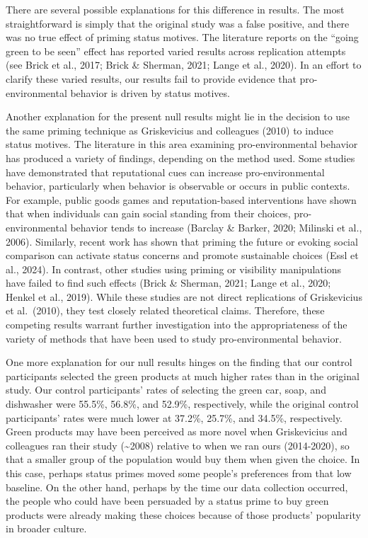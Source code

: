 \documentclass[
]{article}
\begin{document}
There are several possible explanations for this difference in results.
The most straightforward is simply that the original study was a false
positive, and there was no true effect of priming status motives. The
literature reports on the ``going green to be seen'' effect has reported
varied results across replication attempts (see Brick et al., 2017;
Brick \& Sherman, 2021; Lange et al., 2020). In an effort to clarify
these varied results, our results fail to provide evidence that
pro-environmental behavior is driven by status motives.

Another explanation for the present null results might lie in the
decision to use the same priming technique as Griskevicius and
colleagues (2010) to induce status motives. The literature in this area
examining pro-environmental behavior has produced a variety of findings,
depending on the method used. Some studies have demonstrated that
reputational cues can increase pro-environmental behavior, particularly
when behavior is observable or occurs in public contexts. For example,
public goods games and reputation-based interventions have shown that
when individuals can gain social standing from their choices,
pro-environmental behavior tends to increase (Barclay \& Barker, 2020;
Milinski et al., 2006). Similarly, recent work has shown that priming
the future or evoking social comparison can activate status concerns and
promote sustainable choices (Essl et al., 2024). In contrast, other
studies using priming or visibility manipulations have failed to find
such effects (Brick \& Sherman, 2021; Lange et al., 2020; Henkel et al.,
2019). While these studies are not direct replications of Griskevicius
et al.~(2010), they test closely related theoretical claims. Therefore,
these competing results warrant further investigation into the
appropriateness of the variety of methods that have been used to study
pro-environmental behavior.

One more explanation for our null results hinges on the finding that our
control participants selected the green products at much higher rates
than in the original study. Our control participants' rates of selecting
the green car, soap, and dishwasher were 55.5\%, 56.8\%, and 52.9\%,
respectively, while the original control participants' rates were much
lower at 37.2\%, 25.7\%, and 34.5\%, respectively. Green products may
have been perceived as more novel when Griskevicius and colleagues ran
their study (\textasciitilde2008) relative to when we ran ours
(2014-2020), so that a smaller group of the population would buy them
when given the choice. In this case, perhaps status primes moved some
people's preferences from that low baseline. On the other hand, perhaps
by the time our data collection occurred, the people who could have been
persuaded by a status prime to buy green products were already making
these choices because of those products' popularity in broader culture.
\end{document}
